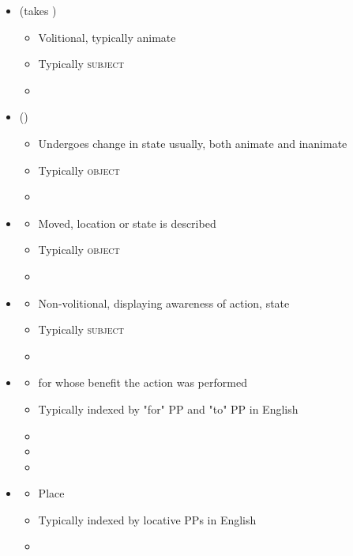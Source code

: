 \documentclass[headrule,footrule]{foils}
\begin{document}
\begin{itemize}
\item {} (takes )
  \begin{itemize}
  \item  Volitional, typically animate
  \item Typically \textsc{subject}
  \item  {}
  \end{itemize}
\item  {} ()
  \begin{itemize}
  \item  Undergoes change in state usually, both animate and 
    inanimate
  \item Typically \textsc{object}
  \item  {}
  \end{itemize}

\item  {}
  \begin{itemize}
  \item  Moved, location or state is described
  \item Typically \textsc{object}
  \item  {}
  \end{itemize}
\newpage
\item  {}
  \begin{itemize}
  \item   Non-volitional, displaying awareness of action, state
  \item Typically \textsc{subject}
  \item   {}
  \end{itemize}
\item  {}
  \begin{itemize}
  \item   for whose benefit the action was performed
  \item   Typically indexed by "for" PP and "to" PP in English
  \item  {}
  \item  {}
  \item  {}
  \end{itemize}
\newpage  
\item  {}
  \begin{itemize}
  \item  Place
  \item Typically indexed by locative PPs in English
  \item  {}
  \end{itemize}


\end{itemize}
\end{document}
